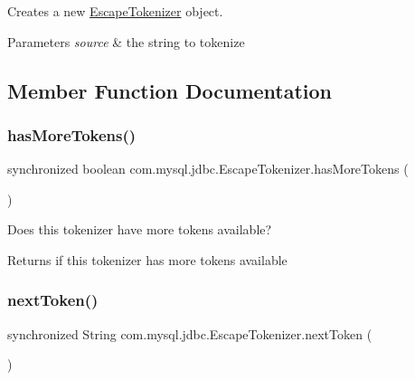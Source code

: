Creates a new \mbox{\hyperlink{classcom_1_1mysql_1_1jdbc_1_1_escape_tokenizer}{Escape\+Tokenizer}} object.


\begin{DoxyParams}{Parameters}
{\em source} & the string to tokenize \\
\hline
\end{DoxyParams}


\subsection{Member Function Documentation}
\mbox{\label{classcom_1_1mysql_1_1jdbc_1_1_escape_tokenizer_ab1958b29194626c956437ca52ece738d}} 
\subsubsection{\texorpdfstring{has\+More\+Tokens()}{hasMoreTokens()}}
{\footnotesize\ttfamily synchronized boolean com.\+mysql.\+jdbc.\+Escape\+Tokenizer.\+has\+More\+Tokens (\begin{DoxyParamCaption}{ }\end{DoxyParamCaption})}

Does this tokenizer have more tokens available?

\begin{DoxyReturn}{Returns}
if this tokenizer has more tokens available 
\end{DoxyReturn}
\mbox{\label{classcom_1_1mysql_1_1jdbc_1_1_escape_tokenizer_a7e8d003351dbead32c4b2e81ac5b4e86}} 
\subsubsection{\texorpdfstring{next\+Token()}{nextToken()}}
{\footnotesize\ttfamily synchronized String com.\+mysql.\+jdbc.\+Escape\+Tokenizer.\+next\+Token (\begin{DoxyParamCaption}{ }\end{DoxyParamCaption})}

